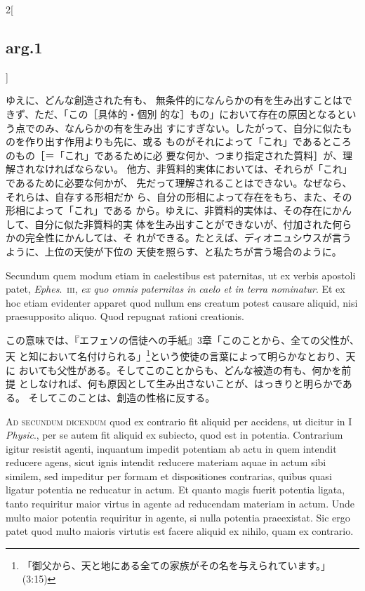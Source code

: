 \documentclass[paper=a4paper,fontsize=10pt,jafontsize=9pt,titlepage]{jlreq}
\begin{document}
\begin{paracol}{2}[\subsection{arg.1}]
\switchcolumn

ゆえに、どんな創造された有も、
 無条件的になんらかの有を生み出すことはできず、ただ、「この［具体的・個別
 的な］もの」において存在の原因となるという点でのみ、なんらかの有を生み出
 すにすぎない。したがって、自分に似たものを作り出す作用よりも先に、或る
 ものがそれによって「これ」であるところのもの［＝「これ」であるために必
 要な何か、つまり指定された質料］が、理解されなければならない。
他方、非質料的実体においては、それらが「これ」であるために必要な何かが、
 先だって理解されることはできない。なぜなら、それらは、自存する形相だか
 ら、自分の形相によって存在をもち、また、その形相によって「これ」である
 から。ゆえに、非質料的実体は、その存在にかんして、自分に似た非質料的実
 体を生み出すことができないが、付加された何らかの完全性にかんしては、そ
 れができる。たとえば、ディオニュシウスが言うように、上位の天使が下位の
 天使を照らす、と私たちが言う場合のように。

\switchcolumn*

Secundum quem modum etiam in caelestibus est paternitas, ut ex verbis
 apostoli patet, {\itshape Ephes}.~{\scshape iii}, {\itshape ex quo
 omnis paternitas in caelo et in terra nominatur}. Et ex hoc etiam
 evidenter apparet quod nullum ens creatum potest causare aliquid, nisi
 praesupposito aliquo. Quod repugnat rationi creationis.

\switchcolumn

この意味では、『エフェソの信徒への手紙』3章「このことから、全ての父性が、天
 と知において名付けられる」\footnote{「御父から、天と地にある全ての家族がその名を与えられています。」(3:15)}という使徒の言葉によって明らかなとおり、天に
 おいても父性がある。そしてこのことからも、どんな被造の有も、何かを前提
 としなければ、何も原因として生み出さないことが、はっきりと明らかである。
 そしてこのことは、創造の性格に反する。

\switchcolumn*[\subsection{ad.2}]

{\scshape Ad secundum dicendum} quod ex contrario fit aliquid per
 accidens, ut dicitur in I {\itshape Physic}., per se autem fit aliquid
 ex subiecto, quod est in potentia. Contrarium igitur resistit agenti,
 inquantum impedit potentiam ab actu in quem intendit reducere agens,
 sicut ignis intendit reducere materiam aquae in actum sibi similem, sed
 impeditur per formam et dispositiones contrarias, quibus quasi ligatur
 potentia ne reducatur in actum. Et quanto magis fuerit potentia ligata,
 tanto requiritur maior virtus in agente ad reducendam materiam in
 actum. Unde multo maior potentia requiritur in agente, si nulla
 potentia praeexistat. Sic ergo patet quod multo maioris virtutis est
 facere aliquid ex nihilo, quam ex contrario.


\end{paracol}
\end{document}
